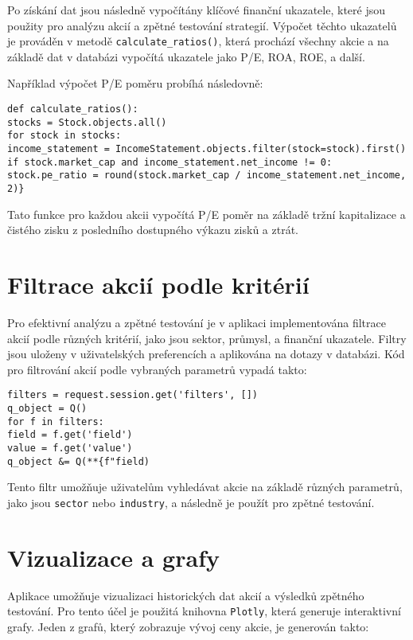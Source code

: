 \documentclass[12pt, a4paper]{report}
\begin{document}
Po získání dat jsou následně vypočítány klíčové finanční ukazatele, které jsou použity pro analýzu akcií a zpětné testování strategií. Výpočet těchto ukazatelů je prováděn v metodě \texttt{calculate\_ratios()}, která prochází všechny akcie a na základě dat v databázi vypočítá ukazatele jako P/E, ROA, ROE, a další.

Například výpočet P/E poměru probíhá následovně:

\begin{lstlisting}[style=Python, caption= Ratios] 
def calculate_ratios():
stocks = Stock.objects.all()
for stock in stocks:
income_statement = IncomeStatement.objects.filter(stock=stock).first()
if stock.market_cap and income_statement.net_income != 0:
stock.pe_ratio = round(stock.market_cap / income_statement.net_income, 2)}
\end{lstlisting}
Tato funkce pro každou akcii vypočítá P/E poměr na základě tržní kapitalizace a čistého zisku z posledního dostupného výkazu zisků a ztrát.

\section{Filtrace akcií podle kritérií}


Pro efektivní analýzu a zpětné testování je v aplikaci implementována filtrace akcií podle různých kritérií, jako jsou sektor, průmysl, a finanční ukazatele. Filtry jsou uloženy v uživatelských preferencích a aplikována na dotazy v databázi. Kód pro filtrování akcií podle vybraných parametrů vypadá takto:

\begin{lstlisting}[style=Python, caption= Filtr] 
filters = request.session.get('filters', [])
q_object = Q()
for f in filters:
field = f.get('field')
value = f.get('value')
q_object &= Q(**{f"field)
\end{lstlisting}

Tento filtr umožňuje uživatelům vyhledávat akcie na základě různých parametrů, jako jsou \texttt{sector} nebo \texttt{industry}, a následně je použít pro zpětné testování.

\section{Vizualizace a grafy}


Aplikace umožňuje vizualizaci historických dat akcií a výsledků zpětného testování. Pro tento účel je použitá knihovna \texttt{Plotly}, která generuje interaktivní grafy. Jeden z grafů, který zobrazuje vývoj ceny akcie, je generován takto:
\end{document}

